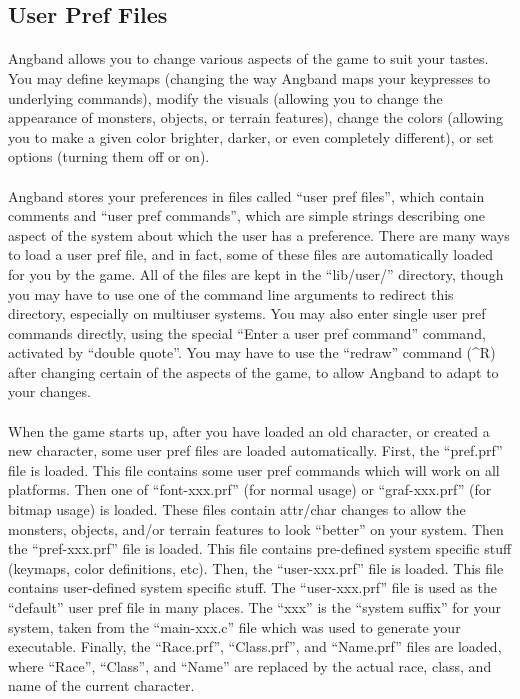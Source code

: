 \subsection{User Pref Files}
\paragraph{}Angband allows you to change various aspects of the game to suit
your tastes. You may define keymaps (changing the way Angband maps your
keypresses to underlying commands), modify the visuals (allowing you to
change the appearance of monsters, objects, or terrain features), change
the colors (allowing you to make a given color brighter, darker, or even
completely different), or set options (turning them off or on).

\paragraph{}Angband stores your preferences in files called ``user pref
files'', which contain comments and ``user pref commands'', which are
simple strings describing one aspect of the system about which the user
has a preference.  There are many ways to load a user pref file, and in
fact, some of these files are automatically loaded for you by the game.
All of the files are kept in the ``lib/user/'' directory, though you may
have to use one of the command line arguments to redirect this
directory, especially on multiuser systems. You may also enter single
user pref commands directly, using the special ``Enter a user pref
command'' command, activated by ``double quote''.  You may have to use
the ``redraw'' command (\^{}R) after changing certain of the aspects of
the game, to allow Angband to adapt to your changes.

\paragraph{}When the game starts up, after you have loaded an old character,
or created a new character, some user pref files are loaded automatically.
First, the ``pref.prf'' file is loaded. This file contains some user pref
commands which will work on all platforms. Then one of ``font-xxx.prf''
(for normal usage) or ``graf-xxx.prf'' (for bitmap usage) is loaded. These
files contain attr/char changes to allow the monsters, objects, and/or
terrain features to look ``better'' on your system. Then the
``pref-xxx.prf''
file is loaded. This file contains pre-defined system specific stuff
(keymaps, color definitions, etc). Then, the ``user-xxx.prf'' file is loaded.
This file contains user-defined system specific stuff. The
``user-xxx.prf''
file is used as the ``default'' user pref file in many places. The
``xxx'' is
the ``system suffix'' for your system, taken from the ``main-xxx.c'' file which
was used to generate your executable. Finally, the ``Race.prf'',
``Class.prf'',
and ``Name.prf'' files are loaded, where ``Race'', ``Class'', and
``Name'' are
replaced by the actual race, class, and name of the current character.

